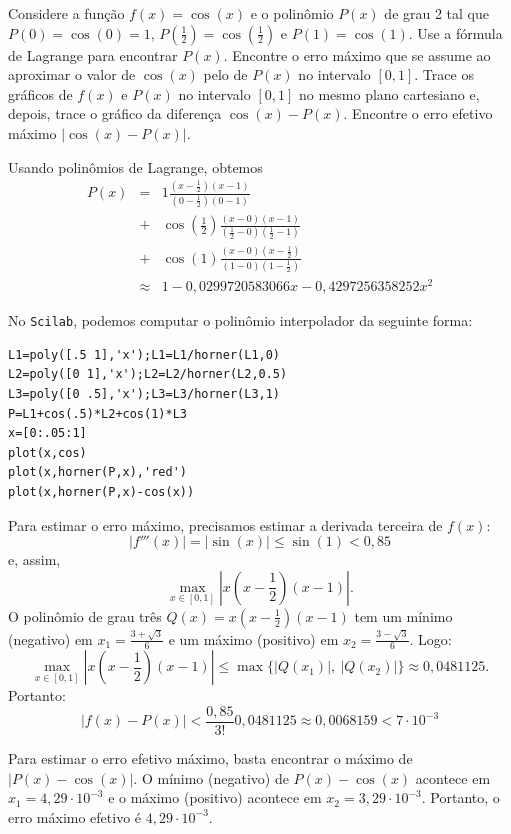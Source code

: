 \begin{ex}
Considere a função $f(x)=\cos(x)$ e o polinômio $P(x)$ de grau 2 tal que $P(0)=\cos(0)=1$, $P(\frac{1}{2})=\cos(\frac{1}{2})$ e $P(1)=\cos(1)$. Use a fórmula de Lagrange para encontrar $P(x)$. Encontre o erro máximo que se assume ao aproximar o valor de $\cos(x)$ pelo de $P(x)$ no intervalo $[0,1]$. Trace os gráficos de $f(x)$ e $P(x)$ no intervalo $[0,1]$ no mesmo plano cartesiano e, depois, trace o gráfico da diferença $\cos(x)-P(x)$. Encontre o erro efetivo máximo $|\cos(x)-P(x)|$.
\end{ex}
\begin{sol}
  Usando polinômios de Lagrange, obtemos
  \begin{eqnarray*}
    P(x) &=& 1\frac{(x-\frac{1}{2})(x-1)}{(0-\frac{1}{2})(0-1)}\\
    &+& \cos\left(\frac{1}{2}\right)\frac{(x-0)(x-1)}{(\frac{1}{2}-0)(\frac{1}{2}-1)}\\
    &+& \cos(1)\frac{(x-0)(x-\frac{1}{2})}{(1-0)(1-\frac{1}{2})}\\
    &\approx&   1 - 0,0299720583066x - 0,4297256358252x^2
\end{eqnarray*}

\ifisscilab
No \verb+Scilab+, podemos computar o polinômio interpolador da seguinte forma:
\begin{verbatim}
L1=poly([.5 1],'x');L1=L1/horner(L1,0)
L2=poly([0 1],'x');L2=L2/horner(L2,0.5)
L3=poly([0 .5],'x');L3=L3/horner(L3,1)
P=L1+cos(.5)*L2+cos(1)*L3
x=[0:.05:1]
plot(x,cos)
plot(x,horner(P,x),'red')
plot(x,horner(P,x)-cos(x))
\end{verbatim}
\fi

Para estimar o erro máximo, precisamos estimar a derivada terceira de $f(x)$:
$$|f'''(x)|=|\sin(x)|\leq \sin(1)<0,85$$
e, assim,
$$
\max_{x\in[0,1]} \left|x\left(x-\frac{1}{2}\right)(x-1)\right|.
$$
O polinômio de grau três $Q(x)=x\left(x-\frac{1}{2}\right)(x-1)$ tem um mínimo (negativo) em $x_1=\frac{3+\sqrt{3}}{6}$ e um máximo (positivo) em $x_2=\frac{3-\sqrt{3}}{6}$. Logo:
$$
\max_{x\in[0,1]} \left|x\left(x-\frac{1}{2}\right)(x-1)\right|\leq \max\{|Q(x_1)|,\ |Q(x_2)|\}\approx 0,0481125.
$$
Portanto:
$$
|f(x)-P(x)|< \frac{0,85}{3!}0,0481125\approx 0,0068159<7\cdot 10^{-3}
$$

Para estimar o erro efetivo máximo, basta encontrar o máximo de $|P(x)-\cos(x)|$. O mínimo (negativo) de $P(x)-\cos(x)$ acontece em $x_1=4,29\cdot 10^{-3}$ e o máximo (positivo) acontece em $x_2=3,29\cdot 10^{-3}$. Portanto, o erro máximo efetivo é $4,29\cdot 10^{-3}$.
\end{sol}


